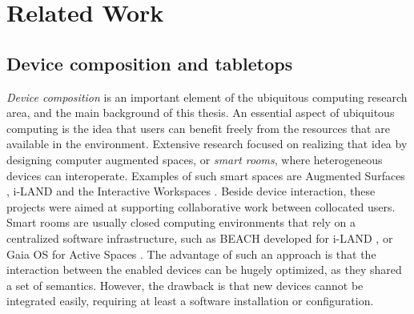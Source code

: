 \chapter{Related Work}
\label{relatedwork}


\section{Device composition and tabletops}

\emph{Device composition} is an important element of the ubiquitous computing research area, and the main background of this thesis.
An essential aspect of ubiquitous computing is the idea that users can benefit freely from the resources that are available in the environment.
Extensive research focused on realizing that idea by designing computer augmented spaces, or \emph{smart rooms}, where heterogeneous devices can interoperate.
Examples of such smart spaces are Augmented Surfaces \citep{Rekimoto:1999:augmentedsurfaces}, 
\mbox{i-LAND} \citep{Streitz:1999:iland} and the Interactive Workspaces \citep{Johanson:2002:iroom}.
Beside device interaction, these projects were aimed at supporting collaborative work between collocated users.
Smart rooms are usually closed computing environments that rely on a centralized software infrastructure, such as BEACH developed for i-LAND \citep{Tandler:2001:smartenv}, or Gaia OS for Active Spaces \citep{Roman:2002:gaia}.
The advantage of such an approach is that the interaction between the enabled devices can be hugely optimized, as they shared a set of semantics.
However, the drawback is that new devices cannot be integrated easily, requiring at least a software installation or configuration.

